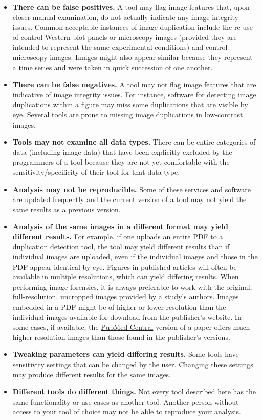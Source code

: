 \documentclass[letterpaper, 12pt]{article}
\begin{document}
\begin{itemize}
    \setlength\itemsep{-0.5em}
    \item \textbf{There can be false positives.} A tool may flag image features that, upon closer manual examination, do not actually indicate any image integrity issues. Common acceptable instances of image duplication include the re-use of control Western blot panels or microscopy images (provided they are intended to represent the same experimental conditions) and control microscopy images. Images might also appear similar because they represent a time series and were taken in quick succession of one another.
    \item \textbf{There can be false negatives.} A tool may not flag image features that are indicative of image integrity issues. For instance, software for detecting image duplications within a figure may miss some duplications that are visible by eye. Several tools are prone to missing image duplications in low-contrast images.
    \item \textbf{Tools may not examine all data types.} There can be entire categories of data (including image data) that have been explicitly excluded by the programmers of a tool because they are not yet comfortable with the sensitivity/specificity of their tool for that data type.
    \item \textbf{Analysis may not be reproducible.} Some of these services and software are updated frequently and the current version of a tool may not yield the same results as a previous version.
    \item \textbf{Analysis of the same images in a different format may yield different results.} For example, if one uploads an entire PDF to a duplication detection tool, the tool may yield different results than if individual images are uploaded, even if the individual images and those in the PDF appear identical by eye. Figures in published articles will often be available in multiple resolutions, which can yield differing results. When performing image forensics, it is always preferable to work with the original, full-resolution, uncropped images provided by a study's authors. Images embedded in a PDF might be of higher or lower resolution than the individual images available for download from the publisher’s website. In some cases, if available, the \href{https://pmc.ncbi.nlm.nih.gov/}{PubMed Central} version of a paper offers much higher-resolution images than those found in the publisher’s versions. 
    \item \textbf{Tweaking parameters can yield differing results.} Some tools have sensitivity settings that can be changed by the user. Changing these settings may produce different results for the same images.
    \item \textbf{Different tools do different things.} Not every tool described here has the same functionality or use cases as another tool. Another person without access to your tool of choice may not be able to reproduce your analysis.
\end{itemize}
\end{document}
